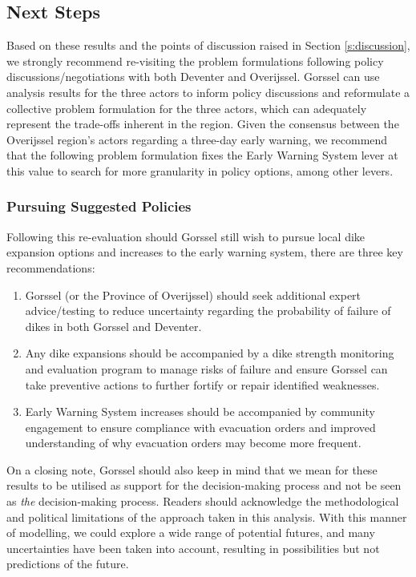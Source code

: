 \subsection{Next Steps}
Based on these results and the points of discussion raised in Section \ref{s:discussion}, we strongly recommend re-visiting the problem formulations following policy discussions/negotiations with both Deventer and Overijssel. Gorssel can use analysis results for the three actors to inform policy discussions and reformulate a collective problem formulation for the three actors, which can adequately represent the trade-offs inherent in the region. Given the consensus between the Overijssel region's actors regarding a three-day early warning, we recommend that the following problem formulation fixes the Early Warning System lever at this value to search for more granularity in policy options, among other levers.

\subsubsection{Pursuing Suggested Policies}
Following this re-evaluation should Gorssel still wish to pursue local dike expansion options and increases to the early warning system, there are three key recommendations:
\begin{enumerate}
    \item Gorssel (or the Province of Overijssel) should seek additional expert advice/testing to reduce uncertainty regarding the probability of failure of dikes in both Gorssel and Deventer.
    \item Any dike expansions should be accompanied by a dike strength monitoring and evaluation program to manage risks of failure and ensure Gorssel can take preventive actions to further fortify or repair identified weaknesses.
    \item Early Warning System increases should be accompanied by community engagement to ensure compliance with evacuation orders and improved understanding of why evacuation orders may become more frequent.
\end{enumerate}

\noindent On a closing note, Gorssel should also keep in mind that we mean for these results to be utilised as support for the decision-making process and not be seen as \textit{the} decision-making process. Readers should acknowledge the methodological and political limitations of the approach taken in this analysis. With this manner of modelling, we could explore a wide range of potential futures, and many uncertainties have been taken into account, resulting in possibilities but not predictions of the future.